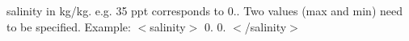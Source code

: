 salinity in kg/kg. e.\+g. 35 ppt corresponds to 0.. Two values (max and min) need to be specified. Example\+: $<$salinity$>$ 0. 0. $<$/salinity$>$ 